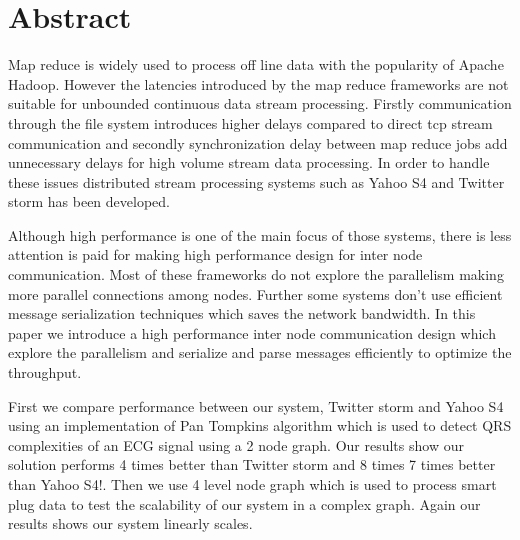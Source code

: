 \section{Abstract}
Map reduce is widely used to process off line data with the popularity of Apache Hadoop. However the latencies introduced by the map reduce frameworks are not suitable for unbounded continuous data stream processing. Firstly communication through the file system introduces higher delays compared to direct tcp stream communication and secondly synchronization delay between map reduce jobs add unnecessary delays for high volume stream data processing. In order to handle these issues  distributed stream processing systems such as Yahoo S4 and Twitter storm has been developed. 


Although high performance is one of the main focus of those systems, there is less attention is paid for making high performance design for inter node communication. Most of these frameworks do not explore the parallelism making more parallel connections among nodes. Further some systems don't use efficient message serialization techniques which saves the network bandwidth. In this paper we introduce a high performance inter node communication design which explore the parallelism and serialize and parse messages efficiently to optimize the throughput. 


First we compare performance between our system, Twitter storm and  Yahoo S4 using an implementation of Pan Tompkins algorithm which is used to detect QRS complexities of an ECG signal using a 2 node graph. Our results show our solution performs 4 times better than Twitter storm and 8 times 7 times better than Yahoo S4!. Then we use 4 level node graph which is used to process smart plug data to test the scalability of our system in a complex graph. Again our results shows our system linearly scales.
